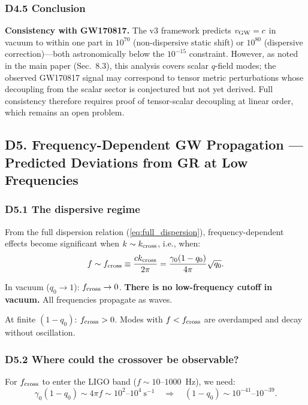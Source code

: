 \documentclass[reprint]{revtex4-2}
\begin{document}
\subsubsection{D4.5 Conclusion}

\textbf{Consistency with GW170817.} The v3 framework predicts $v_{\rm GW} = c$ in vacuum to within one part in $10^{70}$ (non-dispersive static shift) or $10^{80}$ (dispersive correction)---both astronomically below the $10^{-15}$ constraint. However, as noted in the main paper (Sec.~8.3), this analysis covers scalar $q$-field modes; the observed GW170817 signal may correspond to tensor metric perturbations whose decoupling from the scalar sector is conjectured but not yet derived. Full consistency therefore requires proof of tensor-scalar decoupling at linear order, which remains an open problem.

\subsection{D5. Frequency-Dependent GW Propagation --- Predicted Deviations from GR at Low Frequencies}

\subsubsection{D5.1 The dispersive regime}

From the full dispersion relation (\ref{eq:full_dispersion}), frequency-dependent effects become significant when $k \sim k_{\rm cross}$, i.e., when:
\begin{equation}
f \sim f_{\rm cross} \equiv \frac{c k_{\rm cross}}{2\pi} = \frac{\gamma_0(1-q_0)}{4\pi}\sqrt{q_0}.
\end{equation}

In vacuum ($q_0 \to 1$): $f_{\rm cross} \to 0$. \textbf{There is no low-frequency cutoff in vacuum.} All frequencies propagate as waves.

At finite $(1-q_0)$: $f_{\rm cross} > 0$. Modes with $f < f_{\rm cross}$ are overdamped and decay without oscillation.

\subsubsection{D5.2 Where could the crossover be observable?}

For $f_{\rm cross}$ to enter the LIGO band ($f \sim 10$--$1000$~Hz), we need:
\begin{equation}
\gamma_0(1-q_0) \sim 4\pi f \sim 10^2\text{--}10^4~\text{s}^{-1} \quad\Longrightarrow\quad (1-q_0) \sim 10^{-41}\text{--}10^{-39}.
\end{equation}
\end{document}
